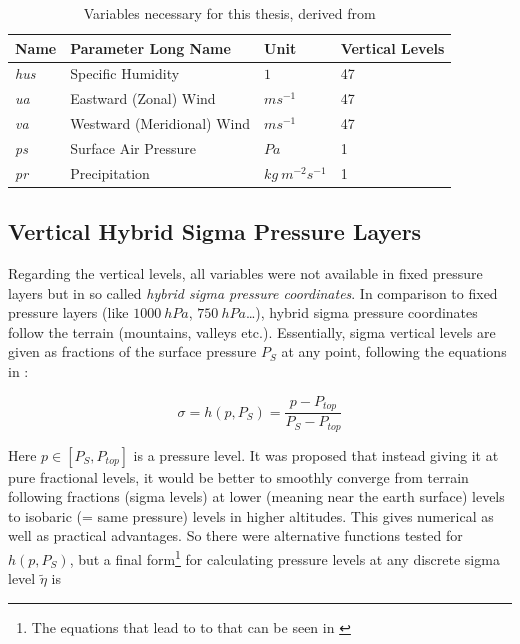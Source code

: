 \begin{table}[bht]
\centering
\caption{Variables necessary for this thesis, derived from \cite{olonscheck_new_2023}}
\begin{tabular}{l|l|l|l}
  \label{tab:thesisVariables}
\textbf{Name} & \textbf{Parameter Long Name} & \textbf{Unit}                & \multicolumn{1}{l}{\textbf{Vertical Levels}}  \\ 
\hline
\textit{hus}              & Specific Humidity            & $1$                        & 47                                            \\
\textit{ua}               & Eastward (Zonal) Wind        & $ms^{-1}$              & 47                                            \\
\textit{va}               & Westward (Meridional) Wind   & $ms^{-1}$              & 47                                            \\
\textit{ps}               & Surface Air Pressure         & $Pa$                           & 1                                             \\
\textit{pr}               & Precipitation                & $kg~m^{-2} s^{-1}$ & 1                                            
\end{tabular}
\end{table}


\subsection{Vertical Hybrid Sigma Pressure Layers}


Regarding the vertical levels, all variables were not available in fixed pressure layers but in so called \textit{hybrid sigma pressure coordinates}. 
In comparison to fixed pressure layers (like $1000 ~hPa$, $750 ~hPa$\dots), hybrid sigma pressure coordinates follow the terrain (mountains, valleys etc.). 
Essentially, sigma vertical levels are given as fractions of the surface pressure $P_S$ at any point, following the equations in \cite{eckermann_hybrid_2009}: 

\begin{equation}
\label{eq:sigma-definition}
\sigma = h(p,P_S) = \frac{p - P_{top}}{P_S - P_{top}}
\end{equation}

Here $p \in [P_S, P_{top}]$ is a pressure level. 
It was proposed that instead giving it at pure fractional levels, it would be better to smoothly converge from terrain following fractions (sigma levels) at lower (meaning near the earth surface) levels to isobaric (= same pressure) levels in higher altitudes. 
This gives numerical as well as practical advantages.
So there were alternative functions tested for $h(p, P_S)$, but a final form\footnote{The equations that lead to to that can be seen in \cite{eckermann_hybrid_2009}} for calculating pressure levels at any discrete sigma level $\tilde{\eta}$ is


